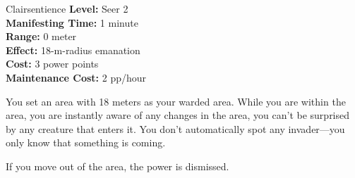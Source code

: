 {Clairsentience}
{
	\textbf{Level:}
	Seer 2\\
	\textbf{Manifesting Time:}
	1 minute\\
	\textbf{Range:}
	0 meter\\
	\textbf{Effect:}
	18-m-radius emanation\\
	\textbf{Cost:}
	3 power points\\
	\textbf{Maintenance Cost:}
	2 pp/hour\\
}
{
	You set an area with 18 meters as your warded area. While you are within the area, you are instantly aware of any changes in the area, you can't be surprised by any creature that enters it. You don't automatically spot any invader---you only know that something is coming.

	If you move out of the area, the power is dismissed.
}